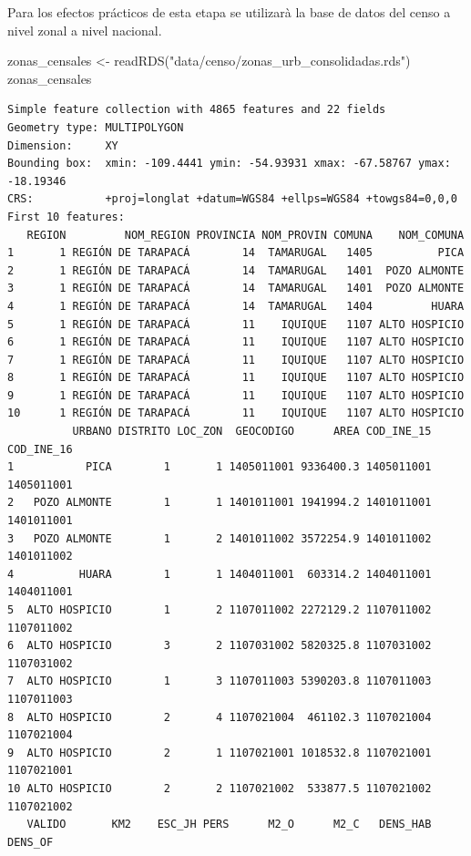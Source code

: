 \documentclass[
  letterpaper,
  DIV=11,
  numbers=noendperiod]{scrreprt}
\newenvironment{Shaded}{\begin{snugshade}}{\end{snugshade}}
\newcommand{\FunctionTok}[1]{\textcolor[rgb]{0.28,0.35,0.67}{#1}}
\newcommand{\NormalTok}[1]{\textcolor[rgb]{0.00,0.23,0.31}{#1}}
\newcommand{\OtherTok}[1]{\textcolor[rgb]{0.00,0.23,0.31}{#1}}
\newcommand{\StringTok}[1]{\textcolor[rgb]{0.13,0.47,0.30}{#1}}
\begin{document}
Para los efectos prácticos de esta etapa se utilizarà la base de datos
del censo a nivel zonal a nivel nacional.

\begin{Shaded}
\begin{Highlighting}[]
\NormalTok{zonas\_censales }\OtherTok{\textless{}{-}}  \FunctionTok{readRDS}\NormalTok{(}\StringTok{"data/censo/zonas\_urb\_consolidadas.rds"}\NormalTok{)}
\NormalTok{zonas\_censales}
\end{Highlighting}
\end{Shaded}

\begin{verbatim}
Simple feature collection with 4865 features and 22 fields
Geometry type: MULTIPOLYGON
Dimension:     XY
Bounding box:  xmin: -109.4441 ymin: -54.93931 xmax: -67.58767 ymax: -18.19346
CRS:           +proj=longlat +datum=WGS84 +ellps=WGS84 +towgs84=0,0,0
First 10 features:
   REGION         NOM_REGION PROVINCIA NOM_PROVIN COMUNA    NOM_COMUNA
1       1 REGIÓN DE TARAPACÁ        14  TAMARUGAL   1405          PICA
2       1 REGIÓN DE TARAPACÁ        14  TAMARUGAL   1401  POZO ALMONTE
3       1 REGIÓN DE TARAPACÁ        14  TAMARUGAL   1401  POZO ALMONTE
4       1 REGIÓN DE TARAPACÁ        14  TAMARUGAL   1404         HUARA
5       1 REGIÓN DE TARAPACÁ        11    IQUIQUE   1107 ALTO HOSPICIO
6       1 REGIÓN DE TARAPACÁ        11    IQUIQUE   1107 ALTO HOSPICIO
7       1 REGIÓN DE TARAPACÁ        11    IQUIQUE   1107 ALTO HOSPICIO
8       1 REGIÓN DE TARAPACÁ        11    IQUIQUE   1107 ALTO HOSPICIO
9       1 REGIÓN DE TARAPACÁ        11    IQUIQUE   1107 ALTO HOSPICIO
10      1 REGIÓN DE TARAPACÁ        11    IQUIQUE   1107 ALTO HOSPICIO
          URBANO DISTRITO LOC_ZON  GEOCODIGO      AREA COD_INE_15 COD_INE_16
1           PICA        1       1 1405011001 9336400.3 1405011001 1405011001
2   POZO ALMONTE        1       1 1401011001 1941994.2 1401011001 1401011001
3   POZO ALMONTE        1       2 1401011002 3572254.9 1401011002 1401011002
4          HUARA        1       1 1404011001  603314.2 1404011001 1404011001
5  ALTO HOSPICIO        1       2 1107011002 2272129.2 1107011002 1107011002
6  ALTO HOSPICIO        3       2 1107031002 5820325.8 1107031002 1107031002
7  ALTO HOSPICIO        1       3 1107011003 5390203.8 1107011003 1107011003
8  ALTO HOSPICIO        2       4 1107021004  461102.3 1107021004 1107021004
9  ALTO HOSPICIO        2       1 1107021001 1018532.8 1107021001 1107021001
10 ALTO HOSPICIO        2       2 1107021002  533877.5 1107021002 1107021002
   VALIDO       KM2    ESC_JH PERS      M2_O      M2_C   DENS_HAB   DENS_OF

\end{verbatim}
\end{document}
